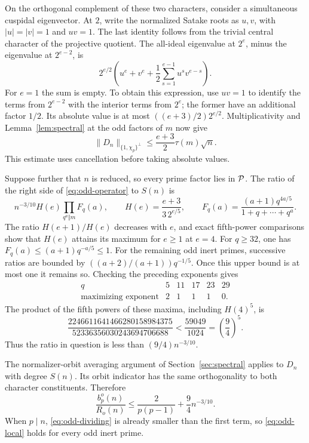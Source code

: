 On the orthogonal complement of these two characters, consider a
simultaneous cuspidal eigenvector. At $2$, write the normalized Satake
roots as $u,v$, with $|u|=|v|=1$ and $uv=1$. The last identity follows
from the trivial central character of the projective quotient. The
all-ideal eigenvalue at $2^e$, minus the eigenvalue at $2^{e-2}$, is
\[
2^{e/2}\left(u^e+v^e+
\frac12\sum_{s=1}^{e-1}u^s v^{e-s}\right).
\]
For $e=1$ the sum is empty. To obtain this expression, use $uv=1$ to
identify the terms from $2^{e-2}$ with the interior terms from $2^e$;
the former have an additional factor $1/2$. Its absolute value is at most $((e+3)/2)2^{e/2}$. Multiplicativity and
Lemma~\ref{lem:spectral} at the odd factors of $m$ now give
\begin{equation}\label{eq:odd-operator}
\|D_n\|_{\{1,\chi_p\}^\perp}
\le\frac{e+3}{2}\tau(m)\sqrt n.
\end{equation}
This estimate uses cancellation before taking absolute values.

Suppose further that $n$ is reduced, so every prime factor lies in
$\mathcal P$. The ratio of the right side of \eqref{eq:odd-operator} to $S(n)$ is
\[
n^{-3/10} H(e)\prod_{q^a\Vert m}F_q(a),\qquad
H(e)=\frac{e+3}{3\,2^{e/5}},\qquad
F_q(a)=\frac{(a+1)q^{4a/5}}{1+q+\cdots+q^a}.
\]
The ratio $H(e+1)/H(e)$ decreases with $e$, and exact fifth-power
comparisons show that $H(e)$ attains its maximum for $e\ge1$ at $e=4$.
For $q\ge32$, one has $F_q(a)\le(a+1)q^{-a/5}\le1$.
For the remaining odd inert primes, successive ratios are bounded by
$((a+2)/(a+1))q^{-1/5}$. Once this upper bound is at most one it remains
so. Checking the preceding exponents gives
\[
\begin{array}{c|rrrrr}
q&5&11&17&23&29\\
\text{maximizing exponent}&2&1&1&1&0.
\end{array}
\]
The product of the fifth powers of these maxima, including $H(4)^5$, is
\[
\frac{2246611641466280158984375}{52336356030243694706688}
<\frac{59049}{1024}=\left(\frac94\right)^5.
\]
Thus the ratio in question is less than $(9/4)n^{-3/10}$.

The normalizer-orbit averaging argument of Section~\ref{sec:spectral}
applies to $D_n$ with degree $S(n)$. Its orbit indicator has the same
orthogonality to both character constituents. Therefore
\begin{equation}\label{eq:odd-local}
\frac{b_p^o(n)}{R_o(n)}
\le\frac{2}{p(p-1)}+\frac94n^{-3/10}.
\end{equation}
When $p\mid n$, \eqref{eq:odd-dividing} is already smaller than the first
term, so \eqref{eq:odd-local} holds for every odd inert prime.

